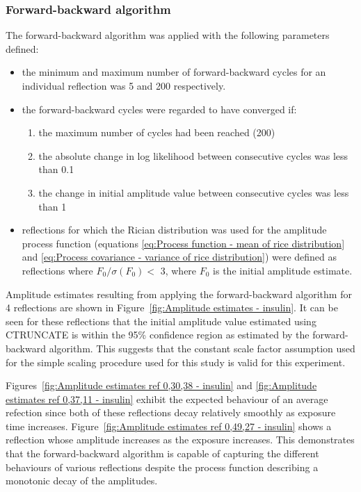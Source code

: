 \subsubsection{Forward-backward algorithm}
\label{subs:Forward-backward algorithm - insulin}
The forward-backward algorithm was applied with the following parameters defined:
\begin{itemize}
    \item the minimum and maximum number of forward-backward cycles for an individual reflection was 5 and 200 respectively.
    \item the forward-backward cycles were regarded to have converged if:
    \begin{enumerate}
        \item the maximum number of cycles had been reached (200)
        \item the absolute change in log likelihood between consecutive cycles was less than 0.1
        \item the change in initial amplitude value between consecutive cycles was less than 1
    \end{enumerate}
    \item reflections for which the Rician distribution was used for the amplitude process function (equations \ref{eq:Process function - mean of rice distribution} and \ref{eq:Process covariance - variance of rice distribution}) were defined as reflections where $F_0/\sigma(F_0) <$ 3, where $F_0$ is the initial amplitude estimate.
\end{itemize}
Amplitude estimates resulting from applying the forward-backward algorithm for 4 reflections are shown in Figure~\ref{fig:Amplitude estimates - insulin}.
It can be seen for these reflections that the initial amplitude value estimated using CTRUNCATE is within the 95\% confidence region as estimated by the forward-backward algorithm.
This suggests that the constant scale factor assumption used for the simple scaling procedure used for this study is valid for this experiment.

Figures~\ref{fig:Amplitude estimates ref 0,30,38 - insulin} and \ref{fig:Amplitude estimates ref 0,37,11 - insulin} exhibit the expected behaviour of an average refection since both of these reflections decay relatively smoothly as exposure time increases.
Figure~\ref{fig:Amplitude estimates ref 0,49,27 - insulin} shows a reflection whose amplitude increases as the exposure increases.
This demonstrates that the forward-backward algorithm is capable of capturing the different behaviours of various reflections despite the process function describing a monotonic decay of the amplitudes.

